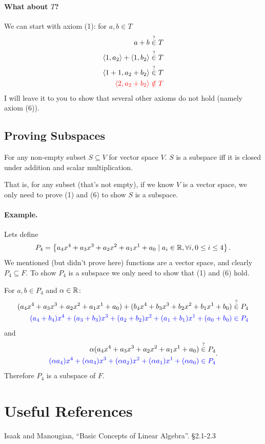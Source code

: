 \paragraph{What about $T$? }
We can start with axiom (1): 
for $a,b \in T$
\[\begin{aligned}
a + b & \stackrel{?}{\in}  T\\
\langle 1,a_2\rangle + \langle 1, b_2\rangle & \stackrel{?}{\in}  T\\
\langle 1+1,a_2+b_2\rangle & \stackrel{?}{\in}  T\\
\color{red} \langle 2,a_2+b_2\rangle& \color{red}\notin T\\
\end{aligned}\]
I will leave it to you to show that several other axioms do not hold (namely axiom (6)). 

\subsection{Proving Subspaces}
For any non-empty subset $S\subseteq V$ for vector space $V$. 
$S$ is a subspace iff it is closed under addition and scalar multiplication. 

That is, for any subset (that's not empty), if we know $V$ is a vector space, we only need to prove (1) and (6) to show $S$ is a subspace. 

\paragraph{Example.}
Lets define \[P_4 = \left\{a_4x^4 + a_3x^3 + a_2x^2 + a_1x^1 + a_0 \mid a_i\in \operatorname{\mathbb{R}}, \forall i, 0 \le i \le 4 \right\}.\]
We mentioned (but didn't prove here) functions are a vector space, and clearly $P_4 \subseteq F$. 
To show $P_4$ is a subspace we only need to show that (1) and (6) hold. 

For $a,b \in P_4$ and $\alpha\in\operatorname{\mathbb{R}}$:
\[\begin{aligned} (a_4x^4 + a_3x^3 + a_2x^2 + a_1x^1 + a_0) + (b_4x^4 + b_3x^3 + b_2x^2 + b_1x^1 + b_0) & \stackrel{?}{\in}  P_4\\
\color{blue}(a_4+b_4)x^4 + (a_3+b_3)x^3 + (a_2+b_2)x^2 + (a_1+b_1)x^1 + (a_0+b_0)  &\color{blue}\in  P_4\end{aligned}\]
and
\[\begin{aligned} \alpha(a_4x^4 + a_3x^3 + a_2x^2 + a_1x^1 + a_0) & \stackrel{?}{\in}  P_4\\
\color{blue}(\alpha a_4)x^4 + (\alpha a_3)x^3 + (\alpha a_2)x^2 + (\alpha a_1)x^1 + (\alpha a_0)  &\color{blue}\in  P_4\end{aligned}.\]
Therefore $P_4$ is a subspace of $F$. 




\section*{Useful References}
Isaak and Manougian, ``Basic Concepts of Linear Algebra''. \S 2.1-2.3\\


